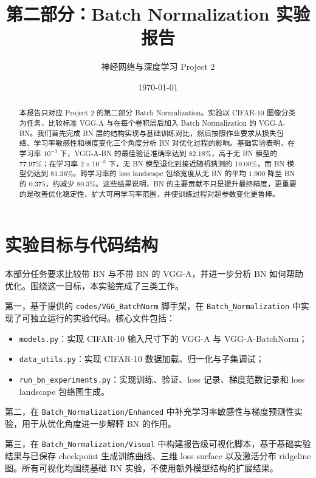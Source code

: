 \documentclass[UTF8,a4paper,11pt]{ctexart}
\title{\textbf{第二部分：Batch Normalization 实验报告}}
\author{神经网络与深度学习 Project 2}
\date{\today}
\begin{document}
\maketitle

\begin{abstract}
本报告只对应 Project 2 的第二部分 Batch Normalization。实验以 CIFAR-10 图像分类为任务，比较标准 VGG-A 与在每个卷积层后加入 Batch Normalization 的 VGG-A-BN。我们首先完成 BN 层的结构实现与基础训练对比，然后按照作业要求从损失包络、学习率敏感性和梯度变化三个角度分析 BN 对优化过程的影响。基础实验表明，在学习率 $10^{-3}$ 下，VGG-A-BN 的最佳验证准确率达到 $82.18\%$，高于无 BN 模型的 $77.97\%$；在学习率 $2\times10^{-3}$ 下，无 BN 模型退化到接近随机猜测的 $10.00\%$，而 BN 模型仍达到 $81.36\%$。跨学习率的 loss landscape 包络宽度从无 BN 的平均 $1.900$ 降至 BN 的 $0.375$，约减少 $80.3\%$。这些结果说明，BN 的主要贡献不只是提升最终精度，更重要的是改善优化稳定性、扩大可用学习率范围，并使训练过程对超参数变化更鲁棒。
\end{abstract}

\tableofcontents
\newpage

\section{实验目标与代码结构}

本部分任务要求比较带 BN 与不带 BN 的 VGG-A，并进一步分析 BN 如何帮助优化。围绕这一目标，本实验完成了三类工作。

第一，基于提供的 \texttt{codes/VGG\_BatchNorm} 脚手架，在 \texttt{Batch\_Normalization} 中实现了可独立运行的实验代码。核心文件包括：
\begin{itemize}
  \item \texttt{models.py}：实现 CIFAR-10 输入尺寸下的 VGG-A 与 VGG-A-BatchNorm；
  \item \texttt{data\_utils.py}：实现 CIFAR-10 数据加载、归一化与子集调试；
  \item \texttt{run\_bn\_experiments.py}：实现训练、验证、loss 记录、梯度范数记录和 loss landscape 包络图生成。
\end{itemize}

第二，在 \texttt{Batch\_Normalization/Enhanced} 中补充学习率敏感性与梯度预测性实验，用于从优化角度进一步解释 BN 的作用。

第三，在 \texttt{Batch\_Normalization/Visual} 中构建报告级可视化脚本，基于基础实验结果与已保存 checkpoint 生成训练曲线、三维 loss surface 以及激活分布 ridgeline 图。所有可视化均围绕基础 BN 实验，不使用额外模型结构的扩展结果。
\end{document}
